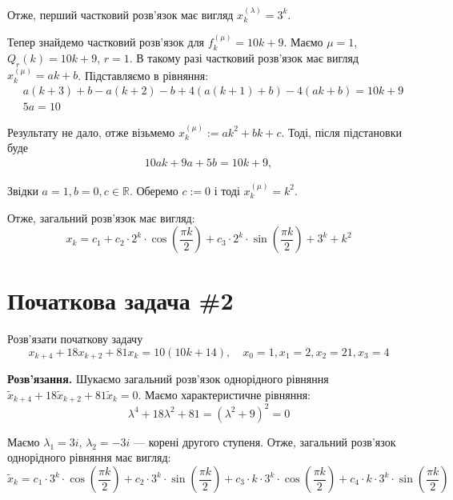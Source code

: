 \documentclass{hw_template}
\begin{document}
Отже, перший частковий розв'язок має вигляд $x_k^{(\lambda)} = 3^k$.

Тепер знайдемо частковий розв'язок для $f_k^{(\mu)} = 10k+9$. Маємо $\mu=1$, $Q_r(k)=10k+9$, $r=1$. В такому разі частковий розв'язок має вигляд $x_k^{(\mu)} = ak+b$. Підставляємо в рівняння:
\begin{align*}
    &a(k+3)+b - a(k+2) - b + 4(a(k+1)+b) - 4(ak+b) = 10k+9 \\
    &5a = 10
\end{align*}

Результату не дало, отже візьмемо $x_k^{(\mu)} := ak^2+bk+c$. Тоді, після підстановки буде
\begin{align*}
    10ak + 9a + 5b = 10k+9,
\end{align*}

Звідки $a=1,b=0,c \in \mathbb{R}$. Оберемо $c := 0$ і тоді $x_k^{(\mu)} = k^2$.

Отже, загальний розв'язок має вигляд:
\begin{equation*}
    \boxed{x_k = c_1 + c_2 \cdot 2^k \cdot \cos\left(\frac{\pi k}{2}\right) + c_3 \cdot 2^k \cdot \sin\left(\frac{\pi k}{2}\right) + 3^k + k^2}
\end{equation*}

\pagebreak

\section{Початкова задача \#2}

\begin{problem}
    Розв'язати початкову задачу
    \begin{equation*}
        x_{k+4} + 18x_{k+2} + 81x_k = 10(10k+14), \quad x_0=1, x_1=2, x_2=21, x_3=4
    \end{equation*}
\end{problem}

\textbf{Розв'язання.} Шукаємо загальний розв'язок однорідного рівняння $\widetilde{x}_{k+4}+18\widetilde{x}_{k+2}+81\widetilde{x}_k=0$. Маємо характеристичне рівняння:
\begin{equation*}
    \lambda^4 + 18\lambda^2 + 81 = (\lambda^2+9)^2 = 0
\end{equation*}

Маємо $\lambda_1 = 3i$, $\lambda_2 = -3i$ --- корені другого ступеня. Отже, загальний розв'язок однорідного рівняння має вигляд:
\begin{equation*}
    \widetilde{x}_k = c_1 \cdot 3^k \cdot \cos\left(\frac{\pi k}{2}\right) + c_2 \cdot 3^k \cdot \sin\left(\frac{\pi k}{2}\right) + c_3 \cdot k \cdot 3^k \cdot \cos\left(\frac{\pi k}{2}\right) + c_4 \cdot k \cdot 3^k \cdot \sin\left(\frac{\pi k}{2}\right)
\end{equation*}
\end{document}
